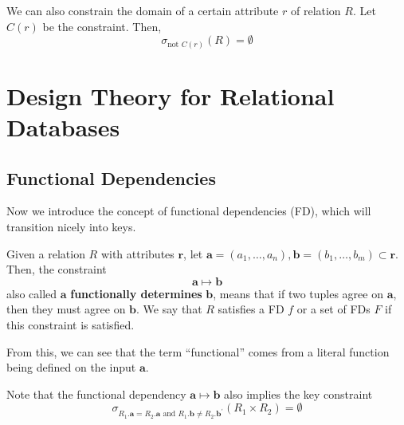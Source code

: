 \documentclass{article}
\begin{document}
    \begin{definition}
      We can also constrain the domain of a certain attribute $r$ of relation $R$. Let $C(r)$ be the constraint. Then, 
      \begin{equation}
        \sigma_{\text{not } C(r)} (R) = \emptyset
      \end{equation}
    \end{definition}

\section{Design Theory for Relational Databases}

  \subsection{Functional Dependencies}

    Now we introduce the concept of functional dependencies (FD), which will transition nicely into keys.  

    \begin{definition}
      Given a relation $R$ with attributes $\mathbf{r}$, let $\mathbf{a} = (a_1, \ldots, a_n), \mathbf{b} = (b_1, \ldots, b_m) \subset \mathbf{r}$. Then, the constraint 
      \begin{equation}
        \mathbf{a} \mapsto \mathbf{b}
      \end{equation}
      also called $\mathbf{a}$ \textbf{functionally determines} $\mathbf{b}$, means that if two tuples agree on $\mathbf{a}$, then they must agree on $\mathbf{b}$. We say that $R$ satisfies a FD $f$ or a set of FDs $F$ if this constraint is satisfied. 
    \end{definition}

    From this, we can see that the term ``functional'' comes from a literal function being defined on the input $\mathbf{a}$. 

    \begin{lemma}
      Note that the functional dependency $\mathbf{a} \mapsto \mathbf{b}$ also implies the key constraint 
      \begin{equation}
        \sigma_{R_1.\mathbf{a} = R_2.\mathbf{a} \text{ and } R_1.\mathbf{b} \neq R_2.\mathbf{b}^\prime} (R_1 \times R_2) = \emptyset
      \end{equation}
    \end{lemma}
\end{document}
